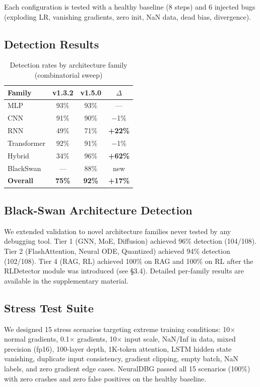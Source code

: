 \documentclass[11pt]{article}
\begin{document}
Each configuration is tested with a healthy baseline (8 steps) and 6 injected bugs (exploding LR, vanishing gradients, zero init, NaN data, dead bias, divergence).

\subsection{Detection Results}

\begin{table}[h]
\centering
\caption{Detection rates by architecture family (combinatorial sweep)}
\begin{tabular}{lccc}
\toprule
\textbf{Family} & \textbf{v1.3.2} & \textbf{v1.5.0} & $\Delta$ \\
\midrule
MLP & 93\% & 93\% & — \\
CNN & 91\% & 90\% & $-$1\% \\
RNN & 49\% & 71\% & \textbf{+22\%} \\
Transformer & 92\% & 91\% & $-$1\% \\
Hybrid & 34\% & 96\% & \textbf{+62\%} \\
BlackSwan & — & 88\% & new \\
\midrule
\textbf{Overall} & \textbf{75\%} & \textbf{92\%} & \textbf{+17\%} \\
\bottomrule
\end{tabular}
\end{table}

\subsection{Black-Swan Architecture Detection}

We extended validation to novel architecture families never tested by any debugging tool. Tier 1 (GNN, MoE, Diffusion) achieved 96\% detection (104/108). Tier 2 (FlashAttention, Neural ODE, Quantized) achieved 94\% detection (102/108). Tier 4 (RAG, RL) achieved 100\% on RAG and 100\% on RL after the RLDetector module was introduced (see \S3.4). Detailed per-family results are available in the supplementary material.

\subsection{Stress Test Suite}

We designed 15 stress scenarios targeting extreme training conditions: 10$\times$ normal gradients, 0.1$\times$ gradients, 10$\times$ input scale, NaN/Inf in data, mixed precision (fp16), 100-layer depth, 1K-token attention, LSTM hidden state vanishing, duplicate input consistency, gradient clipping, empty batch, NaN labels, and zero gradient edge cases. NeuralDBG passed all 15 scenarios (100\%) with zero crashes and zero false positives on the healthy baseline.
\end{document}
